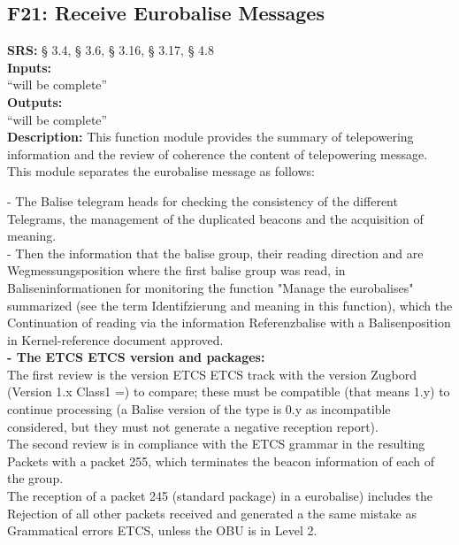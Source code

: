 \documentclass{template/openetcs_report}
\begin{document}
 \subsection{	F21: Receive Eurobalise Messages} 
 \textbf{SRS:} § 3.4, § 3.6, § 3.16, § 3.17, § 4.8\\
 
  \textbf{Inputs:}\\
``will be complete''\\

 \textbf{Outputs:}\\
 ``will be complete''\\
 
 \textbf{Description:} 
 This function module provides the summary of telepowering information and the 
review of coherence the content of telepowering message. 
This module separates the eurobalise message as follows: 
 
 - The Balise telegram heads for checking the consistency of the different 
Telegrams, the management of the duplicated beacons and the acquisition of meaning. \\

- Then the information that the balise group, their reading direction and are 
Wegmessungsposition where the first balise group was read, in 
Baliseninformationen for monitoring the function "Manage the eurobalises" 
summarized (see the term Identifzierung and meaning in this function), which the 
Continuation of reading via the information Referenzbalise with a Balisenposition in 
Kernel-reference document approved. \\

\textbf{- The ETCS ETCS version and packages:} \\

The first review is the version ETCS ETCS track with the version Zugbord 
(Version 1.x Class1 =) to compare; these must be compatible (that means 1.y) to 
continue processing (a Balise version of the type is 0.y as incompatible 
considered, but they must not generate a negative reception report). \\

The second review is in compliance with the ETCS grammar in the resulting 
Packets with a packet 255, which terminates the beacon information of each of the group. \\

The reception of a packet 245 (standard package) in a eurobalise) includes the 
Rejection of all other packets received and generated a the same mistake as 
Grammatical errors ETCS, unless the OBU is in Level 2. \\
\end{document}
